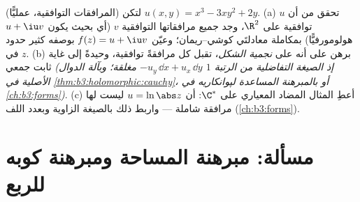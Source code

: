 \begin{exercise}[$\star\star$]\label{exo:b3:conformal:12}
(المرافقات التوافقية، عمليًّا) لتكن $u(x, y) = x^3 - 3xy^2
+ 2y$.
(a) تحقق من أن $u$ توافقية على $\R^2$، وجد جميع مرافقاتها
التوافقية $v$ (أي بحيث يكون $u + \iu v$ هولومورفيًّا) بمكاملة
معادلتَي كوشي--ريمان؛ وعيّن $f(z) =
u + \iu v$ بوصفه كثير حدود في $z$.
(b) برهن على أنه على  \emph{نجمية الشكل}، تقبل كل
 مرافقةً توافقية، وحيدةً إلى غاية ثابت جمعي \emph{(إذ
الصيغة التفاضلية من الرتبة $1$ $-u_y\,\dd x +
u_x\,\dd y$ مغلقة؛ وبآلة الدوال
الأصلية في \cref{thm:b3:holomorphic:cauchy}، أو بالمبرهنة المساعدة لپوانكاريه في
\cref{ch:b3:forms})}.
(c) أعطِ المثال المضاد المعياري على $\C^*$: أن $u = \ln\abs z$
ليست لها مرافقة شاملة --- واربط ذلك بالصيغة الزاوية وبعدد اللف
(\cref{ch:b3:forms}).
\end{exercise}

\section{مسألة: مبرهنة المساحة ومبرهنة كوبه للربع}

